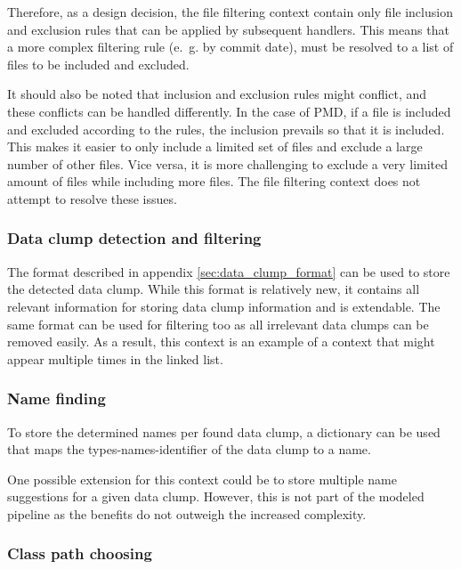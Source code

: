 Therefore, as a design decision, the file filtering context contain only file inclusion and exclusion rules that can be applied by subsequent handlers. This means that a more complex filtering rule (e.~g. by commit date), must be resolved to a list of files to be included and excluded. 

It should also be noted that inclusion and exclusion rules might conflict, and these conflicts can be handled differently. In the case of PMD, if a file is included and excluded according to the rules, the inclusion prevails so that it is included. This makes it easier to only include a limited set of files and exclude a large number of other files. Vice versa, it is more challenging to exclude a very limited amount of files while including more files. The file filtering context does not attempt to resolve these issues. 

\begin{comment}
\subsubsection{Extraction of AST}
\end{comment}
\subsubsection{Data clump detection and filtering}

The format described in appendix \ref{sec:data_clump_format} can be used to store the detected data clump. While this format is relatively new, it contains all relevant information for storing data clump information and is extendable. The same format can be used for filtering too as all irrelevant data clumps can be removed easily. As a result, this context is an example of a context that might appear multiple times in the linked list. 

\subsubsection{Name finding}
To store the determined names per found data clump, a dictionary can be used that maps the types-names-identifier of the data clump to a name.

One possible extension for this context could be to store multiple name suggestions for a given data clump. However, this is not part of the modeled pipeline as the benefits do not outweigh the increased complexity.

\subsubsection{Class path choosing}

